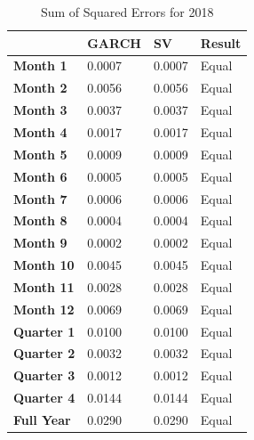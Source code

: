 \documentclass[12pt,letterpaper,reqno,fleqn]{article}
\begin{document}
\begin{table}[!ht]
    \centering
    \begin{tabular}{|l|l|l|l|}
    \hline
        ~ & \textbf{GARCH} & \textbf{SV} & \textbf{Result} \\ \hline
        \textbf{Month 1} & 0.0007 & 0.0007 & Equal \\ \hline
        \textbf{Month 2} & 0.0056 & 0.0056 & Equal \\ \hline
        \textbf{Month 3} & 0.0037 & 0.0037 & Equal \\ \hline
        \textbf{Month 4} & 0.0017 & 0.0017 & Equal \\ \hline
        \textbf{Month 5} & 0.0009 & 0.0009 & Equal \\ \hline
        \textbf{Month 6} & 0.0005 & 0.0005 & Equal \\ \hline
        \textbf{Month 7} & 0.0006 & 0.0006 & Equal \\ \hline
        \textbf{Month 8} & 0.0004 & 0.0004 & Equal \\ \hline
        \textbf{Month 9} & 0.0002 & 0.0002 & Equal \\ \hline
        \textbf{Month 10} & 0.0045 & 0.0045 & Equal \\ \hline
        \textbf{Month 11} & 0.0028 & 0.0028 & Equal \\ \hline
        \textbf{Month 12} & 0.0069 & 0.0069 & Equal \\ \hline
        \textbf{Quarter 1} & 0.0100 & 0.0100 & Equal \\ \hline
        \textbf{Quarter 2} & 0.0032 & 0.0032 & Equal \\ \hline
        \textbf{Quarter 3} & 0.0012 & 0.0012 & Equal \\ \hline
        \textbf{Quarter 4} & 0.0144 & 0.0144 & Equal \\ \hline
        \textbf{Full Year} & 0.0290 & 0.0290 & Equal \\ \hline
    \end{tabular}
\caption{Sum of Squared Errors for 2018}
\end{table}
\end{document}
